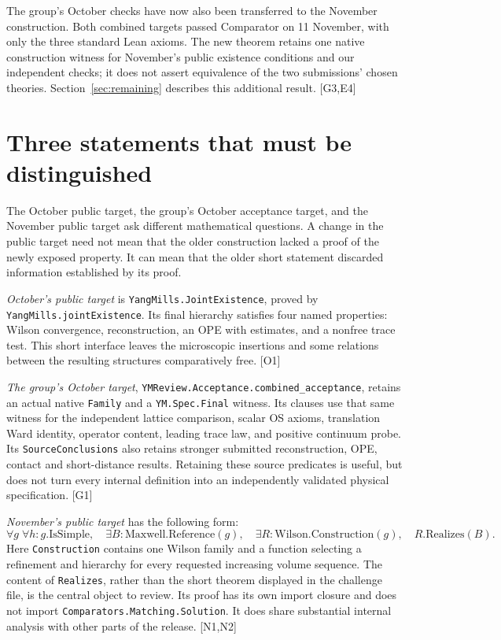 \documentclass[11pt]{article}
\newcommand{\code}[1]{{\small\nolinkurl{#1}}}
\newcommand{\src}[1]{\textsf{[#1]}}
\begin{document}
The group's October checks have now also been transferred to the November
construction. Both combined targets passed Comparator on 11 November, with
only the three standard Lean axioms. The new theorem retains one native
construction witness for November's public existence conditions and our
independent checks; it does not assert equivalence of the two submissions'
chosen theories. Section~\ref{sec:remaining} describes this additional result.
\src{G3,E4}

\section{Three statements that must be distinguished}
\label{sec:three}

The October public target, the group's October acceptance target, and the
November public target ask different mathematical questions. A change in
the public target need not mean that the older construction lacked a proof
of the newly exposed property. It can mean that the older short statement
discarded information established by its proof.

\emph{October's public target} is \code{YangMills.JointExistence}, proved by
\code{YangMills.jointExistence}. Its final hierarchy satisfies four named
properties: Wilson convergence, reconstruction, an OPE with estimates, and a
nonfree trace test. This short interface leaves the microscopic insertions
and some relations between the resulting structures comparatively free.
\src{O1}

\emph{The group's October target},
\code{YMReview.Acceptance.combined_acceptance}, retains an actual native
\code{Family} and a \code{YM.Spec.Final} witness. Its clauses use that same
witness for the independent lattice comparison, scalar OS axioms,
translation Ward identity, operator content, leading trace law, and positive
continuum probe. Its \code{SourceConclusions} also retains stronger submitted
reconstruction, OPE, contact and short-distance results. Retaining these
source predicates is useful, but does not turn every internal definition into
an independently validated physical specification. \src{G1}

\emph{November's public target} has the following form:
\[
 \forall g\;\forall h:g.\mathrm{IsSimple},\quad
 \exists B:\mathrm{Maxwell.Reference}(g),\quad
 \exists R:\mathrm{Wilson.Construction}(g),\quad R.\mathrm{Realizes}(B).
\]
Here \code{Construction} contains one Wilson family and a function selecting
a refinement and hierarchy for every requested increasing volume sequence.
The content of \code{Realizes}, rather than the short theorem displayed in
the challenge file, is the central object to review. Its proof has its own
import closure and does not import \code{Comparators.Matching.Solution}.
It does share substantial internal analysis with other parts of the release.
\src{N1,N2}
\end{document}
